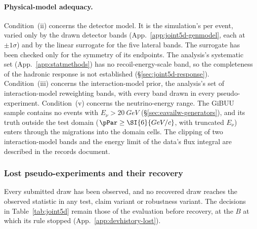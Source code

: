 \paragraph{Physical-model adequacy.} Condition~(ii) concerns the detector model. It is the simulation's per event, varied only by the drawn detector bands (App.~\ref{app:joint5d-genmodel}, each at $\pm1\sigma$) and by the linear surrogate for the five lateral bands. The surrogate has been checked only for the symmetry of its endpoints. The analysis's systematic set (App.~\ref{app:statmethods}) has no recoil-energy-scale band, so the completeness of the hadronic response is not established (\S\ref{sec:joint5d-response}). Condition~(iii) concerns the interaction-model prior, the analysis's set of \jtModelBands{} interaction-model reweighting bands, with every band drawn in every pseudo-experiment. Condition~(v) concerns the neutrino-energy range. The GiBUU sample contains no events with $E_{\nu}>\SI{20}{GeV}$ (\S\ref{sec:eavailw-generators}), and its truth outside the test domain ($\pPar\ge\SI{6}{GeV/c}$, with truncated $E_{\nu}$) enters through the migrations into the domain cells. The clipping of two interaction-model bands and the energy limit of the data's flux integral are described in the records document.


\subsubsection{Lost pseudo-experiments and their recovery}
\label{sec:joint5d-lost}

Every submitted draw has been observed, and no recovered draw reaches the observed statistic in any test, claim variant or robustness variant. The decisions in Table~\ref{tab:joint5d} remain those of the evaluation before recovery, at the $B$ at which its rule stopped (App.~\ref{app:devhistory-lost}).

